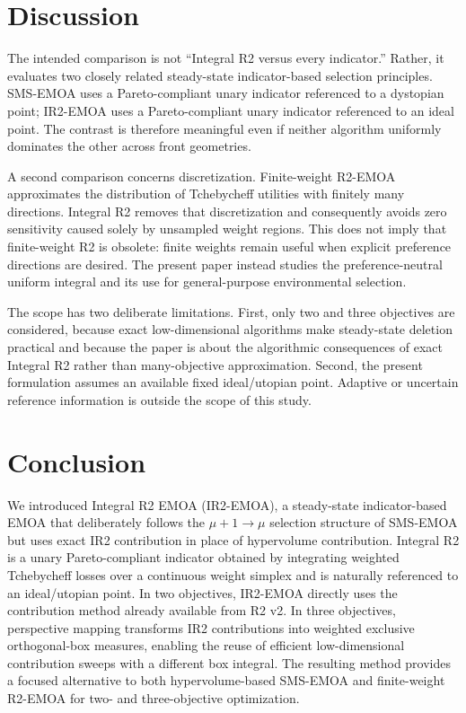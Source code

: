 \documentclass[runningheads]{llncs}
\begin{document}
\section{Discussion}
\label{sec:discussion}

The intended comparison is not ``Integral R2 versus every indicator.'' Rather, it evaluates two closely related steady-state indicator-based selection principles. SMS-EMOA uses a Pareto-compliant unary indicator referenced to a dystopian point; IR2-EMOA uses a Pareto-compliant unary indicator referenced to an ideal point. The contrast is therefore meaningful even if neither algorithm uniformly dominates the other across front geometries.

A second comparison concerns discretization. Finite-weight R2-EMOA approximates the distribution of Tchebycheff utilities with finitely many directions. Integral R2 removes that discretization and consequently avoids zero sensitivity caused solely by unsampled weight regions. This does not imply that finite-weight R2 is obsolete: finite weights remain useful when explicit preference directions are desired. The present paper instead studies the preference-neutral uniform integral and its use for general-purpose environmental selection.

The scope has two deliberate limitations. First, only two and three objectives are considered, because exact low-dimensional algorithms make steady-state deletion practical and because the paper is about the algorithmic consequences of exact Integral R2 rather than many-objective approximation. Second, the present formulation assumes an available fixed ideal/utopian point. Adaptive or uncertain reference information is outside the scope of this study.

\section{Conclusion}
\label{sec:conclusion}

We introduced Integral R2 EMOA (IR2-EMOA), a steady-state indicator-based EMOA that deliberately follows the $\mu+1\rightarrow\mu$ selection structure of SMS-EMOA but uses exact IR2 contribution in place of hypervolume contribution. Integral R2 is a unary Pareto-compliant indicator obtained by integrating weighted Tchebycheff losses over a continuous weight simplex and is naturally referenced to an ideal/utopian point. In two objectives, IR2-EMOA directly uses the contribution method already available from R2 v2. In three objectives, perspective mapping transforms IR2 contributions into weighted exclusive orthogonal-box measures, enabling the reuse of efficient low-dimensional contribution sweeps with a different box integral. The resulting method provides a focused alternative to both hypervolume-based SMS-EMOA and finite-weight R2-EMOA for two- and three-objective optimization.
\end{document}
